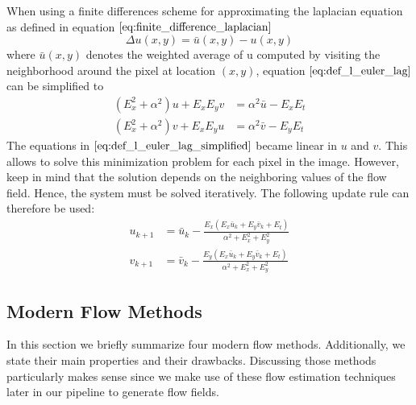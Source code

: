 When using a finite differences scheme for approximating the laplacian equation
as defined in equation $\ref{eq:finite_difference_laplacian}$
\begin{equation}
	\Delta u(x,y) = \bar{u} (x,y) - u(x,y)
\label{eq:finite_difference_laplacian}
\end{equation}
where $\bar{u} (x,y)$ denotes the weighted average of u computed by visiting the neighborhood around the pixel at location $(x,y)$, equation $\ref{eq:def_l_euler_lag}$ can be simplified to
\begin{equation}
\begin{aligned}
(E_x^2 + \alpha^2) u + E_x E_y v &= \alpha^2 \bar{u} - E_x E_t \\
(E_x^2 + \alpha^2) v + E_x E_y u &= \alpha^2 \bar{v} - E_y E_t
\end{aligned}
\label{eq:def_l_euler_lag_simplified}
\end{equation}
The equations in $\ref{eq:def_l_euler_lag_simplified}$ became linear in $u$ and $v$. This allows to solve this minimization problem for each pixel in the image. However, keep in mind that the solution depends on the neighboring values of the flow field. Hence, the system must be solved iteratively. The following update rule can therefore be used:
\begin{equation}
\begin{aligned}
 u_{k+1} &= \bar{u}_k - \frac{E_x (E_x \bar{u}_k + E_y \bar{v}_k + E_t)}{\alpha^2 + E_x^2 + E_y^2} \\
  v_{k+1} &= \bar{v}_k - \frac{E_y (E_x \bar{u}_k + E_y \bar{v}_k + E_t)}{\alpha^2 + E_x^2 + E_y^2}
\end{aligned}
\label{eq:hs_iteration}
\end{equation}

\subsection{Modern Flow Methods}
\label{sec:impl_optical_flow}
In this section we briefly summarize four modern flow methods. Additionally, we state their main properties and their drawbacks. Discussing those methods particularly makes sense since we make use of these flow estimation techniques later in our pipeline to generate flow fields.

